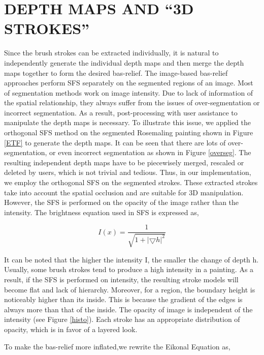 \chapter{DEPTH MAPS AND “3D STROKES”}
Since the brush strokes can be extracted individually, it is natural to independently generate the individual depth maps and then merge the depth maps together to form the desired bas-relief. The image-based bas-relief approaches\cite{zeng2014region} \cite{kolomenkin2011reconstruction} perform SFS separately on the segmented regions of an image. Most of segmentation methods work on image intensity. Due to lack of information of the spatial relationship, they always suffer from the issues of over-segmentation or incorrect segmentation. As a result, post-processing with user assistance to manipulate the depth maps is necessary. To illustrate this issue, we applied the  orthogonal SFS method \cite{prados2004unifying} on the segmented Rosemaling painting shown in Figure \ref{ETF} to generate the depth maps. It can be seen that there are lots of over-segmentation, or even incorrect segmentation as shown in Figure \ref{overseg}. The resulting independent depth maps have to be piecewisely merged, rescaled or deleted by users, which is not trivial and tedious. Thus, in our implementation, we employ the orthogonal SFS \cite{prados2004unifying} on the segmented strokes. These extracted strokes take into account the spatial occlusion and are suitable for 3D manipulation. However, the SFS is performed on the opacity of the image rather than the intensity. The brightness equation used in SFS is expressed as,

\begin{equation*}
I(x)=\frac{1}{\sqrt{1+\lvert \bigtriangledown h \rvert ^2}}
\end{equation*}

It can be noted that the higher the intensity I, the smaller the change of depth h. Usually, some brush strokes tend to produce a high intensity in a painting. As a result, if the SFS is performed on intensity, the resulting stroke models will become flat and lack of hierarchy. Moreover, for a region, the boundary height is noticeably higher than its inside. This is because the gradient of the edges is always more than that of the inside. The opacity of image is independent of the intensity (see Figure \ref{histo}). Each stroke has an appropriate distribution of opacity, which is in favor of a layered look.


To make the bas-relief more inflated,we rewrite the Eikonal Equation as,

